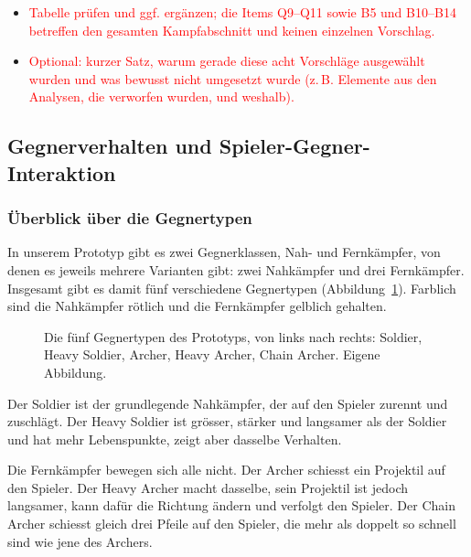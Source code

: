 \documentclass[../Main.tex]{subfiles}
\begin{document}
\begin{itemize}[leftmargin=1.5cm]
    \item \textcolor{red}{Tabelle prüfen und ggf. ergänzen; die Items Q9--Q11 sowie B5 und B10--B14 betreffen den gesamten Kampfabschnitt und keinen einzelnen Vorschlag.}
    \item \textcolor{red}{Optional: kurzer Satz, warum gerade diese acht Vorschläge ausgewählt wurden und was bewusst nicht umgesetzt wurde (z.\,B. Elemente aus den Analysen, die verworfen wurden, und weshalb).}
\end{itemize}

\subsection{Gegnerverhalten und Spieler-Gegner-Interaktion} \label{sec:UmsetzungGegner}

\subsubsection{Überblick über die Gegnertypen} \label{sec:Gegnertypen}

In unserem Prototyp gibt es zwei Gegnerklassen, Nah- und Fernkämpfer, von denen es jeweils mehrere Varianten gibt: zwei Nahkämpfer und drei Fernkämpfer. Insgesamt gibt es damit fünf verschiedene Gegnertypen (Abbildung~\ref{fig:Gegnertypen}). Farblich sind die Nahkämpfer rötlich und die Fernkämpfer gelblich gehalten.

\begin{figure}[H]
    \centering
    \caption[Die fünf Gegnertypen des Prototyps. Eigene Abbildung.]{Die fünf Gegnertypen des Prototyps, von links nach rechts: Soldier, Heavy Soldier, Archer, Heavy Archer, Chain Archer. Eigene Abbildung.}
    \label{fig:Gegnertypen}
\end{figure}

Der Soldier ist der grundlegende Nahkämpfer, der auf den Spieler zurennt und zuschlägt. Der Heavy Soldier ist grösser, stärker und langsamer als der Soldier und hat mehr Lebenspunkte, zeigt aber dasselbe Verhalten.

Die Fernkämpfer bewegen sich alle nicht. Der Archer schiesst ein Projektil auf den Spieler. Der Heavy Archer macht dasselbe, sein Projektil ist jedoch langsamer, kann dafür die Richtung ändern und verfolgt den Spieler. Der Chain Archer schiesst gleich drei Pfeile auf den Spieler, die mehr als doppelt so schnell sind wie jene des Archers.
\end{document}
